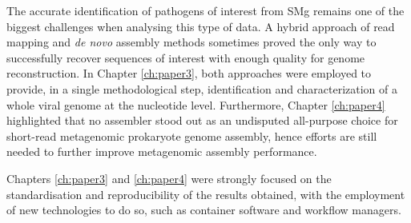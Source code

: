 The accurate identification of pathogens of interest from \ac{SMg} remains one of the biggest challenges when analysing this type of data. A hybrid approach of read mapping and \textit{de novo} assembly methods sometimes proved the only way to successfully recover sequences of interest with enough quality for genome reconstruction. In Chapter \ref{ch:paper3}, both approaches were employed to provide, in a single methodological step, identification and characterization of a whole viral genome at the nucleotide level. Furthermore, Chapter \ref{ch:paper4} highlighted that no assembler stood out as an undisputed all-purpose choice for short-read metagenomic prokaryote genome assembly, hence efforts are still needed to further improve metagenomic assembly performance. 

Chapters \ref{ch:paper3} and \ref{ch:paper4} were strongly focused on the standardisation and reproducibility of the results obtained, with the employment of new technologies to do so, such as container software and workflow managers. 